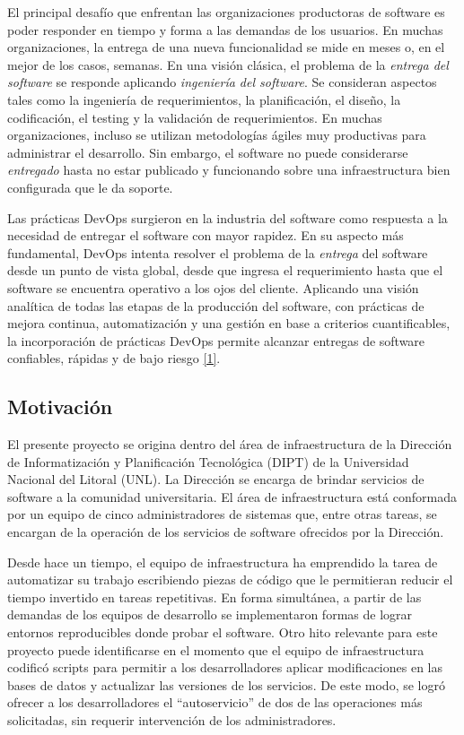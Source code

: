El principal desafío que enfrentan las organizaciones productoras de software es poder responder en tiempo y forma a las demandas de los usuarios. En muchas organizaciones, la entrega de una nueva funcionalidad se mide en meses o, en el mejor de los casos, semanas. En una visión clásica, el problema de la \textit{entrega del software} se responde aplicando \textit{ingeniería del software}. Se consideran aspectos tales como la ingeniería de requerimientos, la planificación, el diseño, la codificación, el testing y la validación de requerimientos. En muchas organizaciones, incluso se utilizan metodologías ágiles muy productivas para administrar el desarrollo. Sin embargo, el software no puede considerarse \textit{entregado} hasta no estar publicado y funcionando sobre una infraestructura bien configurada que le da soporte.

Las prácticas DevOps surgieron en la industria del software como respuesta a la necesidad de entregar el software con mayor rapidez. En su aspecto más fundamental, DevOps intenta resolver el problema de la \textit{entrega} del software desde un punto de vista global, desde que ingresa el requerimiento hasta que el software se encuentra operativo a los ojos del cliente. Aplicando una visión analítica de todas las etapas de la producción del software, con prácticas de mejora continua, automatización y una gestión en base a criterios cuantificables, la incorporación de prácticas DevOps permite alcanzar entregas de software confiables, rápidas y de bajo riesgo \href{https://www.zotero.org/google-docs/?C45eyc}{[1]}.

\subsection{Motivación}

El presente proyecto se origina dentro del área de infraestructura de la Dirección de Informatización y Planificación Tecnológica (DIPT) de la Universidad Nacional del Litoral (UNL). La Dirección se encarga de brindar servicios de software a la comunidad universitaria. El área de infraestructura está conformada por un equipo de cinco administradores de sistemas que, entre otras tareas, se encargan de la operación de los servicios de software ofrecidos por la Dirección.

Desde hace un tiempo, el equipo de infraestructura ha emprendido la tarea de automatizar su trabajo escribiendo piezas de código que le permitieran reducir el tiempo invertido en tareas repetitivas. En forma simultánea, a partir de las demandas de los equipos de desarrollo se implementaron formas de lograr entornos reproducibles donde probar el software. Otro hito relevante para este proyecto puede identificarse en el momento que el equipo de infraestructura codificó scripts para permitir a los desarrolladores aplicar modificaciones en las bases de datos y actualizar las versiones de los servicios. De este modo, se logró ofrecer a los desarrolladores el “autoservicio” de dos de las operaciones más solicitadas, sin requerir intervención de los administradores.

